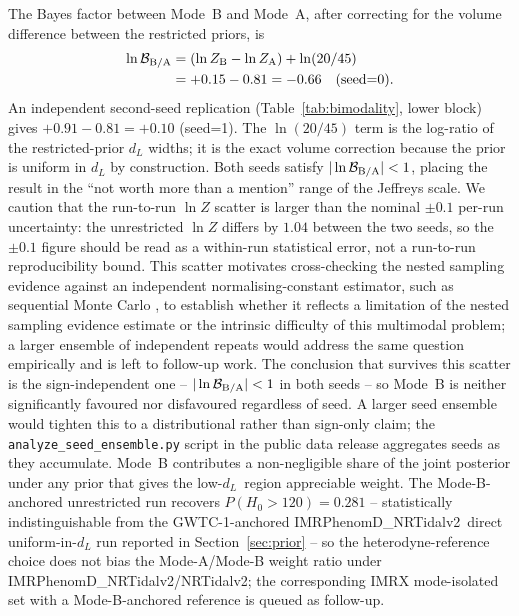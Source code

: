 \documentclass[usenatbib]{mnras}
\newcommand{\hzero}{\ensuremath{H_{0}}\xspace}
\newcommand{\dL}{\ensuremath{d_{L}}\xspace}
\newcommand{\IMR}{IMRPhenomD\_NRTidalv2\xspace}
\begin{document}
The Bayes factor between Mode~B and Mode~A, after correcting for the volume difference between the restricted priors, is
\begin{equation*}
\begin{split}
\ln \mathcal{B}_{\rm B/A} &= (\ln Z_{\rm B}-\ln Z_{\rm A}) + \ln(20/45) \\
&= +0.15 - 0.81 = -0.66 \quad (\text{seed=0}).
\end{split}
\end{equation*}
An independent second-seed replication (Table~\ref{tab:bimodality}, lower block) gives $+0.91 - 0.81 = +0.10$ (seed=1). The $\ln(20/45)$ term is the log-ratio of the restricted-prior $\dL$ widths; it is the exact volume correction because the prior is uniform in $\dL$ by construction. Both seeds satisfy $|\ln\mathcal{B}_{\rm B/A}|<1$, placing the result in the ``not worth more than a mention'' range of the Jeffreys scale. We caution that the run-to-run $\ln Z$ scatter is larger than the nominal $\pm 0.1$ per-run uncertainty: the unrestricted $\ln Z$ differs by $1.04$ between the two seeds, so the $\pm 0.1$ figure should be read as a within-run statistical error, not a run-to-run reproducibility bound. This scatter motivates cross-checking the nested sampling evidence against an independent normalising-constant estimator, such as sequential Monte Carlo \citep{Williams2025SMC}, to establish whether it reflects a limitation of the nested sampling evidence estimate or the intrinsic difficulty of this multimodal problem; a larger ensemble of independent repeats would address the same question empirically and is left to follow-up work. The conclusion that survives this scatter is the sign-independent one -- $|\ln\mathcal{B}_{\rm B/A}|<1$ in both seeds -- so Mode~B is neither significantly favoured nor disfavoured regardless of seed. A larger seed ensemble would tighten this to a distributional rather than sign-only claim; the \texttt{analyze\_seed\_ensemble.py} script in the public data release aggregates seeds as they accumulate. Mode~B contributes a non-negligible share of the joint posterior under any prior that gives the low-\dL\ region appreciable weight. The Mode-B-anchored unrestricted run recovers $P(\hzero>120)=0.281$ -- statistically indistinguishable from the GWTC-1-anchored \IMR\ direct uniform-in-$d_L$ run reported in Section~\ref{sec:prior} -- so the heterodyne-reference choice does not bias the Mode-A/Mode-B weight ratio under \IMR/NRTidalv2; the corresponding IMRX mode-isolated set with a Mode-B-anchored reference is queued as follow-up.
\end{document}
